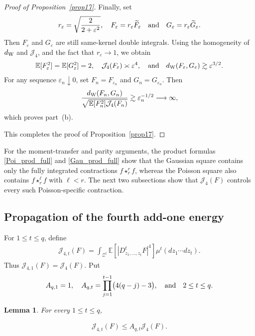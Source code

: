 \documentclass[letterpaper,11pt,reqno]{amsart}
\numberwithin{equation}{section}
\theoremstyle{plain}
\newtheorem{lemma}[theorem]{Lemma}
\theoremstyle{definition}
\theoremstyle{remark}
\newcommand{\E}{\mathbb{E}}
\newcommand{\cZ}{\mathcal{Z}}
\newcommand{\eps}{\varepsilon}
\newcommand{\noi}{\noindent}
\newcommand{\dd}{d}
\newcommand{\Jfour}{\mathcal J_4}
\newcommand{\dW}{d_{\rm W}}
\newcommand{\AND}{\quad{\rm and}\quad}
\begin{document}
\begin{proof}[Proof of Proposition~\ref{prop17}]
Finally, set
\noi
\begin{align*}
 r_\eps
 =
 \sqrt{\frac{2}{2+\eps^2}},
 \quad
 F_\eps=r_\eps\widetilde F_\eps
 \AND
 G_\eps=r_\eps\widetilde G_\eps.
\end{align*}
Then $F_\eps$ and $G_\eps$ are still same-kernel double integrals.
Using the homogeneity of $\dW$ and $\Jfour$, and the fact that
$r_\eps\to1$, we obtain
\noi
\begin{align*}
 \E[F_\eps^2]=\E[G_\eps^2]=2,
 \quad
 \Jfour(F_\eps)\asymp\eps^4,
 \AND
 \dW(F_\eps,G_\eps)\gtrsim\eps^{3/2}.
\end{align*}
For any sequence $\eps_n\downarrow0$, set
$F_n=F_{\eps_n}$ and $G_n=G_{\eps_n}$.  Then
\noi
\begin{align*}
 \frac{\dW(F_n,G_n)}
 {\sqrt{\E[F_n^2]\Jfour(F_n)}}
 \gtrsim
 \eps_n^{-1/2}
 \longrightarrow\infty,
\end{align*}
which proves part~\textup{(b)}.

This completes the proof of Proposition~\ref{prop17}.
\end{proof}


For the moment-transfer and parity arguments, the product formulas
\eqref{Poi_prod_full} and \eqref{Gau_prod_full} show that the Gaussian
square contains only the fully integrated contractions
$f\star_r^r f$, whereas the Poisson square also contains
$f\star_r^\ell f$ with $\ell<r$.  The next two subsections show that
$\Jfour(F)$ controls every such Poisson-specific contraction.

\subsection{Propagation of the fourth add-one energy}
\label{SEC_51}


For $1\leq t\leq q$, define
\noi
\begin{align*}
 \mathcal J_{4,t}(F)
 =\int_{\cZ^t}
 \E\left[\left|D^t_{z_1,\ldots,z_t}F\right|^4\right]
 \mu^t(\dd z_1\cdots\dd z_t).
\end{align*}
Thus $\mathcal J_{4,1}(F)=\Jfour(F)$.  Put
\noi
\begin{align*}
 A_{q,1}=1,
 \quad
 A_{q,t}=\prod_{j=1}^{t-1}\bigl(4(q-j)-3\bigr),
 \AND 2\leq t\leq q.
\end{align*}

\begin{lemma}
\label{lem_J4_prop}
For every $1\leq t\leq q$,

\noi
\begin{align}
 \mathcal J_{4,t}(F)
 \leq
 A_{q,t}\Jfour(F). \label{J4_prop}
\end{align}


\end{lemma}
\end{document}
